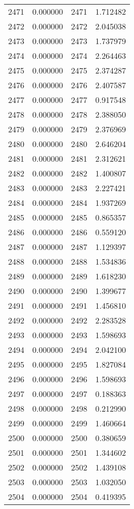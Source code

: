 \documentclass[12pt]{article}
\begin{document}
\begin{longtable}{@{}cccc@{}}
2471 & 0.000000 & 2471 & 1.712482 \\
2472 & 0.000000 & 2472 & 2.045038 \\
2473 & 0.000000 & 2473 & 1.737979 \\
2474 & 0.000000 & 2474 & 2.264463 \\
2475 & 0.000000 & 2475 & 2.374287 \\
2476 & 0.000000 & 2476 & 2.407587 \\
2477 & 0.000000 & 2477 & 0.917548 \\
2478 & 0.000000 & 2478 & 2.388050 \\
2479 & 0.000000 & 2479 & 2.376969 \\
2480 & 0.000000 & 2480 & 2.646204 \\
2481 & 0.000000 & 2481 & 2.312621 \\
2482 & 0.000000 & 2482 & 1.400807 \\
2483 & 0.000000 & 2483 & 2.227421 \\
2484 & 0.000000 & 2484 & 1.937269 \\
2485 & 0.000000 & 2485 & 0.865357 \\
2486 & 0.000000 & 2486 & 0.559120 \\
2487 & 0.000000 & 2487 & 1.129397 \\
2488 & 0.000000 & 2488 & 1.534836 \\
2489 & 0.000000 & 2489 & 1.618230 \\
2490 & 0.000000 & 2490 & 1.399677 \\
2491 & 0.000000 & 2491 & 1.456810 \\
2492 & 0.000000 & 2492 & 2.283528 \\
2493 & 0.000000 & 2493 & 1.598693 \\
2494 & 0.000000 & 2494 & 2.042100 \\
2495 & 0.000000 & 2495 & 1.827084 \\
2496 & 0.000000 & 2496 & 1.598693 \\
2497 & 0.000000 & 2497 & 0.188363 \\
2498 & 0.000000 & 2498 & 0.212990 \\
2499 & 0.000000 & 2499 & 1.460664 \\
2500 & 0.000000 & 2500 & 0.380659 \\
2501 & 0.000000 & 2501 & 1.344602 \\
2502 & 0.000000 & 2502 & 1.439108 \\
2503 & 0.000000 & 2503 & 1.032050 \\
2504 & 0.000000 & 2504 & 0.419395 \\

\end{longtable}
\end{document}
